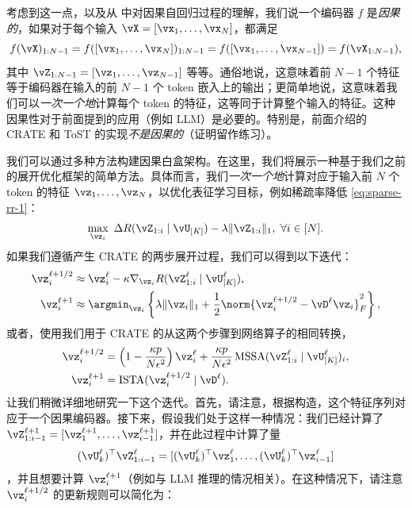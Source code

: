 \documentclass[../../book-main_zh.tex]{subfiles}
\begin{document}
考虑到这一点，以及从  中对因果自回归过程的理解，我们说一个编码器 \(f\) 是\textit{因果的}，如果对于每个输入 \(\vX = [\vx_{1}, \dots, \vx_{N}]\)，都满足
\begin{equation}
    f(\vX)_{1:N-1} = f([\vx_{1}, \dots, \vx_{N}])_{1:N-1} =
    f([\vx_{1}, \dots, \vx_{N - 1}]) = f(\vX_{1:N-1}),
\end{equation}
其中 \(\vZ_{1:N-1} = [\vz_{1}, \dots, \vz_{N-1}]\) 等等。通俗地说，这意味着前 \(N-1\) 个特征等于编码器在输入的前 \(N-1\) 个 token 嵌入上的输出；更简单地说，这意味着我们可以\textit{一次一个地}计算每个 token 的特征，这等同于计算整个输入的特征。这种因果性对于前面提到的应用（例如 LLM）是必要的。特别是，前面介绍的 CRATE 和 ToST 的实现\textit{不是因果的}（证明留作练习）。

我们可以通过多种方法构建因果白盒架构。在这里，我们将展示一种基于我们之前的展开优化框架的简单方法。具体而言，我们\textit{一次一个地}计算对应于输入前 \(N\) 个 token 的特征 \(\vz_{1}, \dots, \vz_{N}\)，以优化表征学习目标，例如稀疏率降低 \eqref{eq:sparse-rr-1}：
\begin{equation}
    \max_{\vz_{i}}\ \Delta R(\vZ_{1:i} \mid \vU_{[K]}) - \lambda
    \|\vZ_{1:i}\|_{1},\ \forall i \in [N].
\end{equation}
如果我们遵循产生 CRATE 的两步展开过程，我们可以得到以下迭代：
\begin{align}
    \vz_{i}^{\ell + 1/2} &\approx \vz_{i}^{\ell} - \kappa
    \nabla_{\vz_{i}} R(\vZ_{1:i}^{\ell} \mid \vU_{[K]}^{\ell}), \\
    \vz_{i}^{\ell + 1} &\approx \argmin_{\vz_{i}} \left\{\lambda
        \|\vz_{i}\|_{1} + \frac{1}{2}\norm{\vz_{i}^{\ell + 1/2} -
    \vD^{\ell} {\vz_{i}}}_F^2\right\},
\end{align}
或者，使用我们用于 CRATE 的从这两个步骤到网络算子的相同转换，
\begin{align}
    \vz_{i}^{\ell + 1/2}
    &= \left(1 - \frac{\kappa p}{N\epsilon^{2}}\right)\vz_{i}^{\ell}
    + \frac{\kappa p}{N
    \epsilon^{2}}\operatorname{MSSA}(\vZ_{1:i}^{\ell} \mid
    \vU_{[K]}^{\ell})_{i}, \\
    \vz_{i}^{\ell + 1}
    &= \operatorname{ISTA}(\vz_{i}^{\ell + 1/2} \mid \vD^{\ell}).
\end{align}
让我们稍微详细地研究一下这个迭代。首先，请注意，根据构造，这个特征序列对应于一个因果编码器。接下来，假设我们处于这样一种情况：我们已经计算了 \(\vZ_{1:i-1}^{\ell + 1} = [\vz_{1}^{\ell +
1}, \dots, \vz_{i-1}^{\ell + 1}]\)，并在此过程中计算了量
\[(\vU_{k}^{\ell})^{\top}\vZ_{1:i-1}^{\ell} =
    [(\vU_{k}^{\ell})^{\top}\vz_{1}^{\ell}, \dots,
(\vU_{k}^{\ell})^{\top}\vz_{i-1}^{\ell}]\]，并且想要计算 \(\vz_{i}^{\ell + 1}\)（例如与 LLM 推理的情况相关）。在这种情况下，请注意 \(\vz_{i}^{\ell + 1/2}\) 的更新规则可以简化为：
\end{document}
